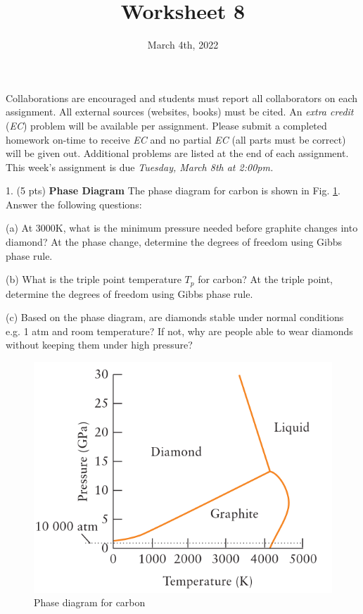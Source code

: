 \documentclass[11pt]{article}
\title{\textbf{Worksheet 8}}
\date{\vspace{-2em}March 4th, 2022}
\begin{document}
\maketitle

Collaborations are encouraged and students must report all collaborators
on each assignment. All external sources (websites, books) must be
cited. An \textit{extra credit} (\textit{EC}) problem will be available per
assignment. Please submit a completed homework on-time to receive \textit{EC}
and no partial \textit{EC} (all parts must be correct) will be given out.
Additional problems are listed at the end of each assignment. This week's
assignment is due \textit{Tuesday, March 8th at 2:00pm.}

1. (5 pts) \textbf{Phase Diagram} The phase diagram for carbon is shown in Fig. \ref{fig:carb}.
Answer the following questions:

(a) At 3000K, what is the minimum pressure needed before graphite changes into
diamond? At the phase change, determine the degrees of freedom using Gibbs phase rule.

(b) What is the triple point temperature $T_p$ for carbon? At the triple point,
determine the degrees of freedom using Gibbs phase rule.

(c) Based on the phase diagram, are diamonds stable under normal conditions e.g.
1 atm and room temperature? If not, why are people able to wear diamonds without
keeping them under high pressure?

\begin{figure}[hbpt]
  \centering
  \includegraphics[scale=0.4]{carbon.png}
  \caption{Phase diagram for carbon}
  \label{fig:carb}
\end{figure}
\end{document}
